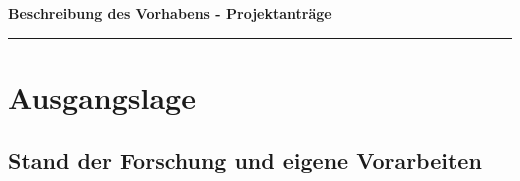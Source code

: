 \documentclass[ngerman]{scrartcl}
\newcommand{\applicants}{[Name, Vorname, Ort aller Antragstellenden]}
\newcommand{\project}{[Titel des Projekts]}
\begin{document}
\pagestyle{empty}
\setcounter{page}{1}

%

\cleardoublepage
\pagestyle{plain}


{\raggedright{} \normalsize \bfseries 
	Beschreibung des Vorhabens - Projektanträge \par
	\applicants{} \par
	\project{} \par
	\rule{\textwidth}{0.5pt} \par
}

\section{Ausgangslage}
\label{sec:work-report}

\subsection*{Stand der Forschung und eigene Vorarbeiten}
\end{document}
